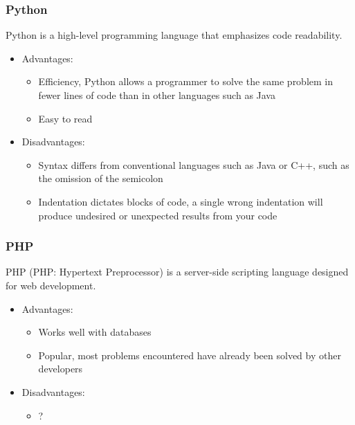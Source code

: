 \documentclass[12pt, letterpaper, twoside]{article}
\begin{document}
			\subsubsection{Python}
				Python is a high-level programming language that emphasizes code readability.
			
				\begin{itemize}
					\item Advantages:
						\begin{itemize}
							\item Efficiency, Python allows a programmer to solve the same problem in fewer lines of code than in other languages such as Java
							\item Easy to read
						\end{itemize}
						
					\item Disadvantages:
						\begin{itemize}
							\item Syntax differs from conventional languages such as Java or C++, such as the omission of the semicolon
							\item Indentation dictates blocks of code, a single wrong indentation will produce undesired or unexpected results from your code
						\end{itemize}
				\end{itemize}
				
			\subsubsection{PHP}
				PHP (PHP: Hypertext Preprocessor) is a server-side scripting language designed for web development.
				
				\begin{itemize}
					\item Advantages:
						\begin{itemize}
							\item Works well with databases
							\item Popular, most problems encountered have already been solved by other developers
						\end{itemize}
						
					\item Disadvantages:
						\begin{itemize}
							\item ?
						\end{itemize}
				\end{itemize}
				
\end{document}
